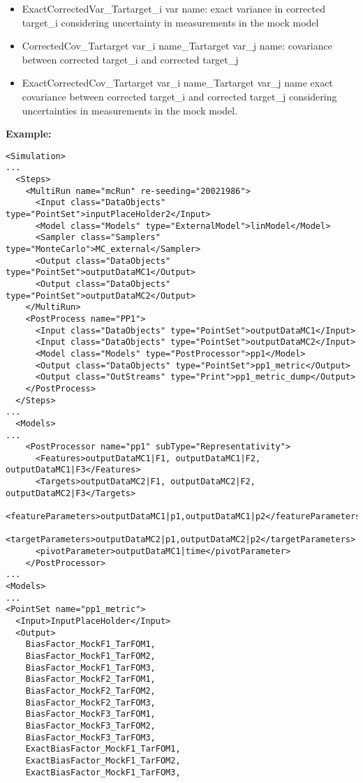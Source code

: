 \begin{itemize}
  \item ExactCorrectedVar\_Tar{target_i var name}: exact variance in corrected target_i considering uncertainty in measurements in the mock model

  \item CorrectedCov\_Tar{target var_i name}\_Tar{target var_j name}: covariance between corrected target_i and corrected target_j

  \item ExactCorrectedCov\_Tar{target var_i name}\_Tar{target var_j name} exact covariance between corrected target_i and corrected target_j considering uncertainties in measurements in the mock model.
\end{itemize}


\textbf{Example:}
\begin{lstlisting}[style=XML,morekeywords={subType}]
<Simulation>
...
  <Steps>
    <MultiRun name="mcRun" re-seeding="20021986">
	  <Input class="DataObjects" type="PointSet">inputPlaceHolder2</Input>
	  <Model class="Models" type="ExternalModel">linModel</Model>
	  <Sampler class="Samplers" type="MonteCarlo">MC_external</Sampler>
	  <Output class="DataObjects" type="PointSet">outputDataMC1</Output>
	  <Output class="DataObjects" type="PointSet">outputDataMC2</Output>
	</MultiRun>
	<PostProcess name="PP1">
	  <Input class="DataObjects" type="PointSet">outputDataMC1</Input>
	  <Input class="DataObjects" type="PointSet">outputDataMC2</Input>
	  <Model class="Models" type="PostProcessor">pp1</Model>
	  <Output class="DataObjects" type="PointSet">pp1_metric</Output>
	  <Output class="OutStreams" type="Print">pp1_metric_dump</Output>
	</PostProcess>
  </Steps>
...
  <Models>
...
	<PostProcessor name="pp1" subType="Representativity">
	  <Features>outputDataMC1|F1, outputDataMC1|F2, outputDataMC1|F3</Features>
	  <Targets>outputDataMC2|F1, outputDataMC2|F2, outputDataMC2|F3</Targets>
	  <featureParameters>outputDataMC1|p1,outputDataMC1|p2</featureParameters>
	  <targetParameters>outputDataMC2|p1,outputDataMC2|p2</targetParameters>
	  <pivotParameter>outputDataMC1|time</pivotParameter>
	</PostProcessor>
...
<Models>
...
<PointSet name="pp1_metric">
  <Input>InputPlaceHolder</Input>
  <Output>
    BiasFactor_MockF1_TarFOM1,
    BiasFactor_MockF1_TarFOM2,
    BiasFactor_MockF1_TarFOM3,
    BiasFactor_MockF2_TarFOM1,
    BiasFactor_MockF2_TarFOM2,
    BiasFactor_MockF2_TarFOM3,
    BiasFactor_MockF3_TarFOM1,
    BiasFactor_MockF3_TarFOM2,
    BiasFactor_MockF3_TarFOM3,
    ExactBiasFactor_MockF1_TarFOM1,
    ExactBiasFactor_MockF1_TarFOM2,
    ExactBiasFactor_MockF1_TarFOM3,

\end{lstlisting}
